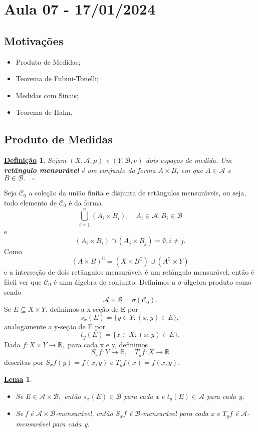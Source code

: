 \documentclass{article}
\newtheorem*{def*}{\underline{Defini\c c\~ao}}
\newtheorem*{lemma*}{\underline{Lema}}
\begin{document}
\newpage
\section{Aula 07 - 17/01/2024}
\subsection{Motivações}
\begin{itemize}
  \item Produto de Medidas; 
  \item Teorema de Fubini-Tonelli;
  \item Medidas com Sinais;
  \item Teorema de Hahn.
\end{itemize}
\subsection{Produto de Medidas}
\begin{def*}
  Sejam \((X, \mathcal{A}, \mu )\) e \((Y, \mathcal{B}, \nu)\) dois espaços de medida. Um \textbf{retângulo mensurável} é um 
  conjunto da forma \(A\times B\), em que \(A\in \mathcal{A}\) e \(B\in \mathcal{B}.\quad \square\)
\end{def*}
Seja \(\mathcal{C}_{0}\) a coleção da união finita e disjunta de retângulos mensuráveis, ou seja, todo elemento de \(\mathcal{C}_{0}\) é da forma 
  \[
    \bigcup_{i=1}^{n}(A_{i}\times B_{i}),\quad A_{i}\in \mathcal{A}, B_{i}\in \mathcal{B}
  \]
e 
  \[
    (A_{i}\times B_{i})\cap (A_{j}\times B_{j}) = \emptyset , i\neq j.
  \]
  Como 
    \[
      (A\times B)^{\complement} = (X\times B ^{\complement})\cup (A ^{\complement}\times Y)
    \]
    e a interseção de dois retângulos mensuráveis é um retângulo mensurável, então é fácil ver que \(\mathcal{C}_{0}\) é uma álgebra de conjunto. Definimos a \(\sigma \)-álgebra produto como sendo 
      \[
        \mathcal{A}\times \mathcal{B} = \sigma (\mathcal{C}_{0}).
      \]
    Se \(E\subseteq X\times Y\), definimos a x-seção de E por 
      \[
        s_x(E) = \{y\in Y: (x, y)\in E\},
      \]
    analogamente a y-seção de E por 
      \[
        t_y(E) = \{x\in X: (x, y)\in E\}.
      \]
    Dada \(f:X\times Y\rightarrow \mathbb{R},\) para cada x e y, definimos 
      \[
        S_{x}f :Y\rightarrow \mathbb{R}, \quad T_{y}f:X\rightarrow \mathbb{R}
      \]
    descritas por \(S_xf(y) = f(x, y)\) e \(T_yf(x) = f(x, y).\)
\begin{lemma*}
 \begin{itemize}
   \item[1)] Se \(E\in \mathcal{A}\times \mathcal{B},\) então \(s_x(E)\in \mathcal{B}\) para cada x e \(t_y(E)\in \mathcal{A}\) para cada y.
   \item[2)] Se f é \(\mathcal{A}\times \mathcal{B}\)-mensurável, então \(S_{x}f\) é \(\mathcal{B}\)-mensurável para cada x e \(T_yf\) é \(\mathcal{A}\)-mensurável para cada y.
 \end{itemize}
\end{lemma*}
\end{document}
